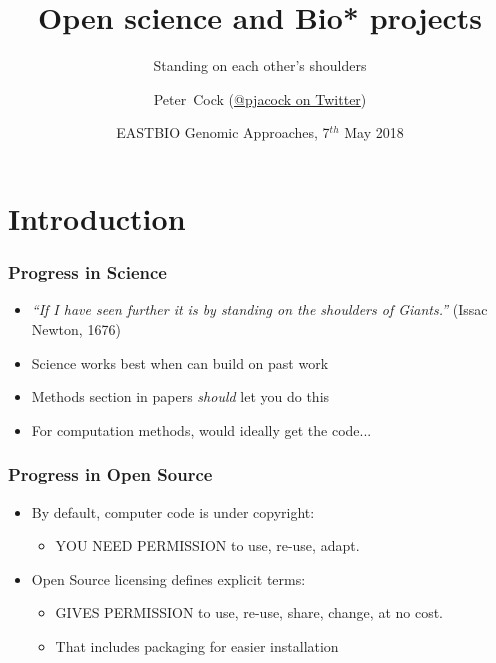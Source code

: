 


\title[Open science and Bio* projects] %
{Open science and Bio* projects}
\subtitle{Standing on each other's shoulders}
\author[Cock] %
{Peter~Cock (\href{https://twitter.com/pjacock}{@pjacock on Twitter})}
\date[July 2017] %
{EASTBIO Genomic Approaches, 7$^{th}$ May 2018}
\subject{Bioinformatics}





\frame[plain]{\titlepage}

\section{Introduction}

\begin{frame}
  \frametitle{Progress in Science}
  \begin{itemize}
    \item \emph{``If I have seen further it is by standing on the shoulders of Giants.''} (Issac Newton, 1676)
    \item Science works best when can build on past work
    \item Methods section in papers \emph{should} let you do this
    \item For computation methods, would ideally get the code...
  \end{itemize}
\end{frame}

\begin{frame}
  \frametitle{Progress in Open Source}
  \begin{itemize}
    \item By default, computer code is under copyright:
      \begin{itemize}
        \item YOU NEED PERMISSION to use, re-use, adapt.
      \end{itemize}
    \item Open Source licensing defines explicit terms:
      \begin{itemize}
        \item GIVES PERMISSION to use, re-use, share, change, at no cost.
        \item That includes packaging for easier installation
      \end{itemize}
  \end{itemize}
\end{frame}

